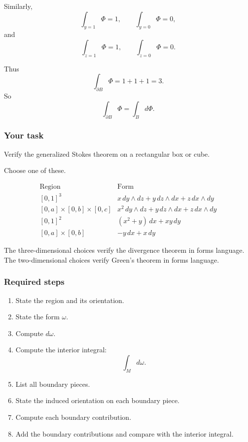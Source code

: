 Similarly,
\[
    \int_{y=1}\Phi=1,
    \qquad
    \int_{y=0}\Phi=0,
\]
and
\[
    \int_{z=1}\Phi=1,
    \qquad
    \int_{z=0}\Phi=0.
\]

Thus
\[
\boxed{
    \int_{\partial B}\Phi=1+1+1=3.
}
\]
So
\[
\boxed{
    \int_{\partial B}\Phi=\int_B d\Phi.
}
\]


\subsubsection*{Your task}

Verify the generalized Stokes theorem on a rectangular box or cube.

Choose one of these.

\[
\begin{array}{c|c}
\text{Region} & \text{Form} \\ \hline
[0,1]^3 &
x\,dy\wedge dz+y\,dz\wedge dx+z\,dx\wedge dy\\[1mm]
[0,a]\times[0,b]\times[0,c] &
x^2\,dy\wedge dz+y\,dz\wedge dx+z\,dx\wedge dy\\[1mm]
[0,1]^2 &
(x^2+y)\,dx+xy\,dy\\[1mm]
[0,a]\times[0,b] &
-y\,dx+x\,dy
\end{array}
\]

The three-dimensional choices verify the divergence theorem in forms language.  The
two-dimensional choices verify Green's theorem in forms language.

\subsubsection*{Required steps}

\begin{enumerate}
\item State the region and its orientation.

\item State the form \(\omega\).

\item Compute \(d\omega\).

\item Compute the interior integral:
\[
    \int_M d\omega.
\]

\item List all boundary pieces.

\item State the induced orientation on each boundary piece.

\item Compute each boundary contribution.

\item Add the boundary contributions and compare with the interior integral.
\end{enumerate}

